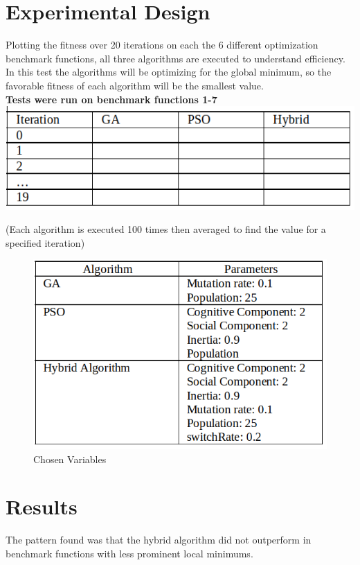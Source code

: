 \documentclass[twocolumn]{article}
\begin{document}
\section{Experimental Design}

Plotting the fitness over 20 iterations on each the 6 different optimization benchmark functions, all three algorithms are executed to understand efficiency. In this test the algorithms will be optimizing for the global minimum, so the favorable fitness of each algorithm will be the smallest value.\\

\textbf{Tests were run on benchmark functions 1-7}\\

\includegraphics[scale=0.4]{Images/table.png}

(Each algorithm is executed 100 times then averaged to find the value for a specified iteration)


\begin{figure}[h!]
\includegraphics[scale=0.39]{Images/setvariables.png}
\caption{Chosen Variables}
\end{figure}

\section{Results}
The pattern found was that the hybrid algorithm did not outperform in benchmark functions with less prominent local minimums.
\end{document}
